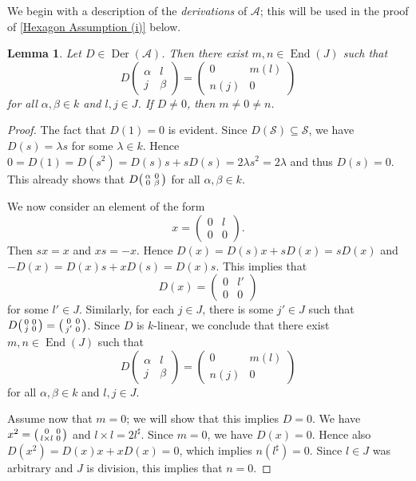 \documentclass[oneside,a4paper]{amsart} %
\newtheorem{lemma}[theorem]{Lemma}
\theoremstyle{definition}
\DeclareMathOperator{\Der}{Der}
\DeclareMathOperator{\End}{End}
\newcommand{\A}{\mathcal{A}}
\renewcommand{\SS}{\mathcal{S}}
\numberwithin{equation}{section}
\begin{document}
We begin with a description of the \textit{derivations} of $\A$; this will be used in the proof of \cref{Hexagon Assumption (i)} below.
\begin{lemma}
\label{Skew dimension derivation}
	Let $D\in\Der(\A)$. Then there exist $m, n\in \End(J)$ such that
	\[  D \begin{pmatrix}
		\alpha & l \\ j & \beta\end{pmatrix} = \begin{pmatrix}
		0 & m(l) \\ n(j) & 0\end{pmatrix} \]
	for all $\alpha,\beta\in k$ and $l,j\in J$. If $D\neq 0$, then $m\neq 0\neq n$.
\end{lemma}
\begin{proof}
    The fact that $D(1)=0$ is evident. Since $D(\SS) \subseteq \SS$, we have $D(s)=\lambda s$ for some $\lambda\in k$. Hence $0=D(1)=D(s^2) = D(s) s + s D(s) = 2\lambda s^2=2\lambda$ and thus $D(s)=0$.
    This already shows that $D \begin{psmallmatrix} \alpha & 0 \\ 0 & \beta \end{psmallmatrix}$ for all $\alpha,\beta \in k$.
    
    We now consider an element of the form
    \[ x=\begin{pmatrix}
		0 & l \\ 0 & 0
	\end{pmatrix} .\]
	Then $sx=x$ and $xs=-x$. Hence $D(x) = D(s)x + sD(x) = sD(x)$ and $-D(x) = D(x)s + xD(s) = D(x)s$. This implies that
	\[ D(x) = \begin{pmatrix}
		0 & l' \\ 0 & 0
	\end{pmatrix} \]
	for some $l'\in J$. Similarly, for each $j \in J$, there is some $j' \in J$ such that $D \begin{psmallmatrix} 0 & 0 \\ j & 0 \end{psmallmatrix} = \begin{psmallmatrix} 0 & 0 \\ j' & 0 \end{psmallmatrix}$.
 	Since $D$ is $k$-linear, we conclude that there exist $m, n\in \End(J)$ such that
	\[  D \begin{pmatrix}
		\alpha & l \\ j & \beta\end{pmatrix} = \begin{pmatrix}
		0 & m(l) \\ n(j) & 0\end{pmatrix} \]
	for all $\alpha,\beta\in k$ and $l,j\in J$. 

	Assume now that $m = 0$; we will show that this implies $D = 0$. We have $x^2 = \begin{psmallmatrix} 0&0\\l\times l&0\end{psmallmatrix}$ and $l\times l=2l^\sharp$.
	Since $m = 0$, we have $D(x) = 0$.
	Hence also $D(x^2) = D(x)x+xD(x) = 0$, which implies $n(l^\sharp)=0$.
	Since $l \in J$ was arbitrary and $J$ is division, this implies that $n = 0$.
\end{proof}
\end{document}
